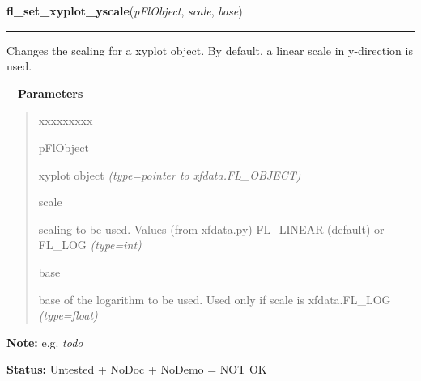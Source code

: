     \vspace{0.5ex}

\hspace{.8\funcindent}\begin{boxedminipage}{\funcwidth}

    \raggedright \textbf{fl\_set\_xyplot\_yscale}(\textit{pFlObject}, \textit{scale}, \textit{base})

    \vspace{-1.5ex}

    \rule{\textwidth}{0.5\fboxrule}
\setlength{\parskip}{2ex}

Changes the scaling for a xyplot object. By default, a linear scale in
y-direction is used.

-{}-
\setlength{\parskip}{1ex}
      \textbf{Parameters}
      \vspace{-1ex}

      \begin{quote}
        \begin{Ventry}{xxxxxxxxx}

          \item[pFlObject]


xyplot object
            {\it (type=pointer to xfdata.FL\_OBJECT)}

          \item[scale]


scaling to be used. Values (from xfdata.py) FL\_LINEAR (default) or
FL\_LOG
            {\it (type=int)}

          \item[base]


base of the logarithm to be used. Used only if scale is xfdata.FL\_LOG
            {\it (type=float)}

        \end{Ventry}

      \end{quote}

\textbf{Note:} 
e.g. \emph{todo}


\textbf{Status:} 
Untested + NoDoc + NoDemo = NOT OK


    \end{boxedminipage}

    \label{xformslib:flxyplot:fl_clear_xyplot}

    \vspace{0.5ex}

